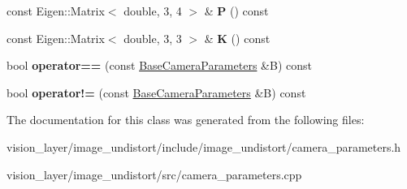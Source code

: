 \begin{DoxyCompactItemize}
\item 
\mbox{\label{classimage__undistort_1_1BaseCameraParameters_a7c063dab97e59ebaed14f20e6bdf3642}} 
const Eigen\+::\+Matrix$<$ double, 3, 4 $>$ \& {\bfseries P} () const
\item 
\mbox{\label{classimage__undistort_1_1BaseCameraParameters_a6de1cedb0186ccd043acd91358763f7e}} 
const Eigen\+::\+Matrix$<$ double, 3, 3 $>$ \& {\bfseries K} () const
\item 
\mbox{\label{classimage__undistort_1_1BaseCameraParameters_a6b2ba6bbe947efe13db70d6ab0700d72}} 
bool {\bfseries operator==} (const \hyperlink{classimage__undistort_1_1BaseCameraParameters}{Base\+Camera\+Parameters} \&B) const
\item 
\mbox{\label{classimage__undistort_1_1BaseCameraParameters_a0e743b0b242034fbfeddecdabb94594f}} 
bool {\bfseries operator!=} (const \hyperlink{classimage__undistort_1_1BaseCameraParameters}{Base\+Camera\+Parameters} \&B) const
\end{DoxyCompactItemize}


The documentation for this class was generated from the following files\+:\begin{DoxyCompactItemize}
\item 
vision\+\_\+layer/image\+\_\+undistort/include/image\+\_\+undistort/camera\+\_\+parameters.\+h\item 
vision\+\_\+layer/image\+\_\+undistort/src/camera\+\_\+parameters.\+cpp\end{DoxyCompactItemize}
